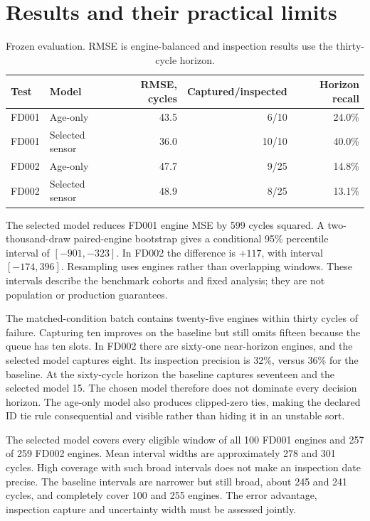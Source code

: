 \documentclass[11pt]{article}
\begin{document}
\section{Results and their practical limits}
\begin{table}[ht]\centering\small
\caption{Frozen evaluation. RMSE is engine-balanced and inspection results use the thirty-cycle horizon.}
\begin{tabular}{llrrr}\toprule
Test & Model & RMSE, cycles & Captured/inspected & Horizon recall\\\midrule
FD001 & Age-only & 43.5 & 6/10 & 24.0\%\\
FD001 & Selected sensor & 36.0 & 10/10 & 40.0\%\\
FD002 & Age-only & 47.7 & 9/25 & 14.8\%\\
FD002 & Selected sensor & 48.9 & 8/25 & 13.1\%\\\bottomrule
\end{tabular}\end{table}

The selected model reduces FD001 engine MSE by 599 cycles squared. A two-thousand-draw paired-engine bootstrap gives a conditional 95\% percentile interval of $[-901,-323]$. In FD002 the difference is $+117$, with interval $[-174,396]$. Resampling uses engines rather than overlapping windows. These intervals describe the benchmark cohorts and fixed analysis; they are not population or production guarantees.

The matched-condition batch contains twenty-five engines within thirty cycles of failure. Capturing ten improves on the baseline but still omits fifteen because the queue has ten slots. In FD002 there are sixty-one near-horizon engines, and the selected model captures eight. Its inspection precision is 32\%, versus 36\% for the baseline. At the sixty-cycle horizon the baseline captures seventeen and the selected model 15. The chosen model therefore does not dominate every decision horizon. The age-only model also produces clipped-zero ties, making the declared ID tie rule consequential and visible rather than hiding it in an unstable sort.

The selected model covers every eligible window of all 100 FD001 engines and 257 of 259 FD002 engines. Mean interval widths are approximately 278 and 301 cycles. High coverage with such broad intervals does not make an inspection date precise. The baseline intervals are narrower but still broad, about 245 and 241 cycles, and completely cover 100 and 255 engines. The error advantage, inspection capture and uncertainty width must be assessed jointly.
\end{document}
